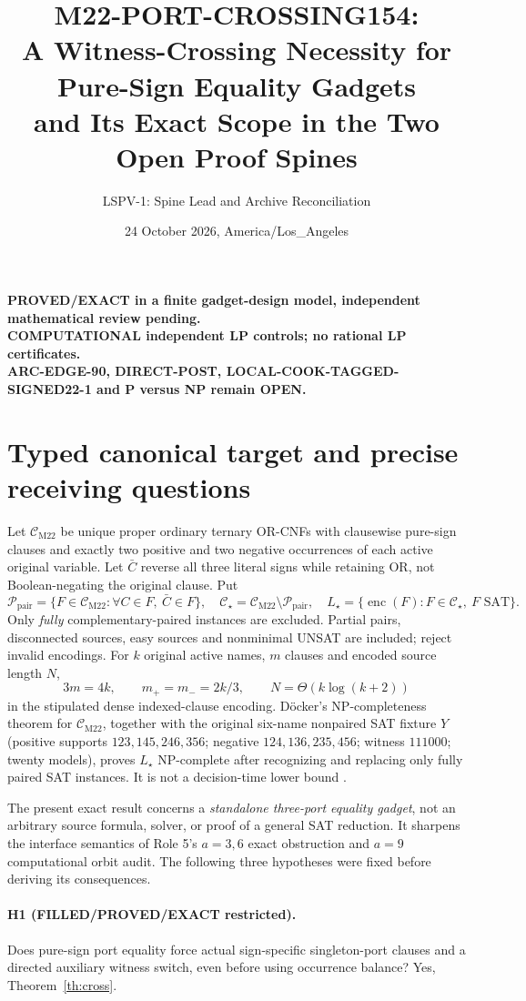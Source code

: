 \documentclass[11pt]{article}
\title{M22-PORT-CROSSING154:\\ A Witness-Crossing Necessity for Pure-Sign Equality Gadgets\\ and Its Exact Scope in the Two Open Proof Spines}
\author{LSPV-1: Spine Lead and Archive Reconciliation}
\date{24 October 2026, America/Los\_Angeles}
\newcommand{\CM}{\mathcal C_{\mathrm{M22}}}
\newcommand{\CS}{\mathcal C_\star}
\begin{document}
\maketitle
\begin{center}
\textbf{PROVED/EXACT in a finite gadget-design model, independent mathematical review pending.}\\
\textbf{COMPUTATIONAL independent LP controls; no rational LP certificates.}\\
\textbf{ARC-EDGE-90, DIRECT-POST, LOCAL-COOK-TAGGED-SIGNED22-1 and P versus NP remain OPEN.}
\end{center}

\section{Typed canonical target and precise receiving questions}
Let $\CM$ be unique proper ordinary ternary OR-CNFs with clausewise pure-sign clauses and exactly two positive and two negative occurrences of each active original variable. Let $\bar C$ reverse all three literal signs while retaining OR, not Boolean-negating the original clause. Put
\[
\mathcal P_{\mathrm{pair}}=\{F\in\CM:\forall C\in F,\ \bar C\in F\},
\quad
\CS=\CM\setminus\mathcal P_{\mathrm{pair}},
\quad L_\star=\{\operatorname{enc}(F):F\in\CS,\ F\text{ SAT}\}.
\]
Only \emph{fully} complementary-paired instances are excluded. Partial pairs, disconnected sources, easy sources and nonminimal UNSAT are included; reject invalid encodings. For $k$ original active names, $m$ clauses and encoded source length $N$,
\[
3m=4k,\qquad m_+=m_-=2k/3,\qquad N=\Theta(k\log(k+2))
\]
in the stipulated dense indexed-clause encoding. D\"ocker's NP-completeness theorem for $\CM$, together with the original six-name nonpaired SAT fixture $Y$ (positive supports $123,145,246,356$; negative $124,136,235,456$; witness $111000$; twenty models), proves $L_\star$ NP-complete after recognizing and replacing only fully paired SAT instances. It is not a decision-time lower bound \cite{docker}.

The present exact result concerns a \emph{standalone three-port equality gadget}, not an arbitrary source formula, solver, or proof of a general SAT reduction. It sharpens the interface semantics of Role 5's $a=3,6$ exact obstruction and $a=9$ computational orbit audit. The following three hypotheses were fixed before deriving its consequences.

\paragraph{H1 (FILLED/PROVED/EXACT restricted).}
Does pure-sign port equality force actual sign-specific singleton-port clauses and a directed auxiliary witness switch, even before using occurrence balance? Yes, Theorem~\ref{th:cross}.
\end{document}
